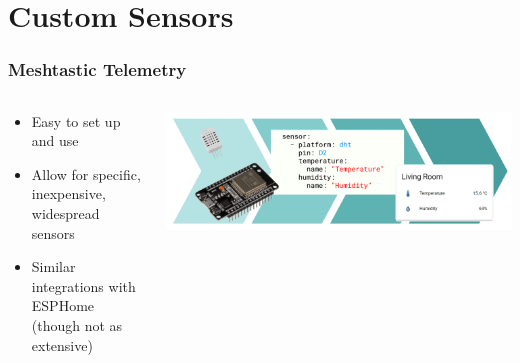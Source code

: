 \documentclass[aspectratio=169]{beamer}
\begin{document}

\section{Custom Sensors}
\frame{\sectionpage}
\begin{frame}[fragile]
  \frametitle{Meshtastic Telemetry}
  \begin{columns}[]
    \begin{column}[T]{0.45\paperwidth}
      \begin{itemize}%
        \item{Easy to set up and use}
        \item{Allow for specific, inexpensive, widespread sensors}
        \item{Similar integrations with ESPHome (though not as extensive)}
     \end{itemize}
    \end{column}
    \begin{column}[T]{0.45\paperwidth}
      \includegraphics[width=0.45\paperwidth,keepaspectratio]{images/esp.png}
    \end{column}
  \end{columns}
\end{frame}
\end{document}
